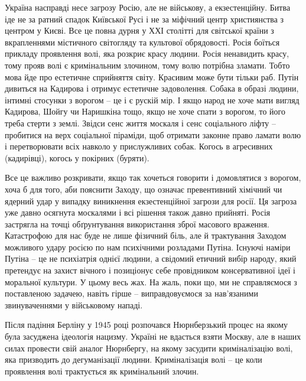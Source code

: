 Україна насправді несе загрозу Росію, але не військову, а екзестенційну. Битва
іде не за ратний спадок Київської Русі і не за міфічний центр християнства з
центром у Києві. Все це повна дурня у ХХІ столітті для світської країни з
вкрапленнями містичного світогляду та культової обрядовості. Росія боїться
прикладу проявлення волі, яка розкриє красу людини. Росія ненавидить красу,
тому прояв волі є кримінальним злочином, тому волю потрібна зламати. Тобто мова
йде про естетичне сприйняття світу. Красивим може бути тільки раб. Путін
дивиться на Кадирова і отримує естетичне задоволення. Собака в образі людини,
інтимні стосунки з ворогом – це і є рускій мір. І якщо народ не хоче мати
вигляд Кадирова, Шойгу чи Наришкіна тощо, якщо не хоче спати з ворогом, то його
треба стерти з землі. Звідси сенс життя москаля і сенс соціального ліфту –
пробитися на верх соціальної піраміди, щоб отримати законне право ламати волю і
перетворювати всіх навколо у прислужливих собак. Когось в агресивних
(кадирівці), когось у покірних (буряти).

Все це важливо розкривати, якщо так хочеться говорити і домовлятися з ворогом,
хоча б для того, аби пояснити Заходу, що означає превентивний хімічний чи
ядерний удар у випадку виникнення екзестенційної загрози для росії. Ця загроза
уже давно осягнута москалями і всі рішення також давно прийняті. Росія
застрягла на точці обґрунтування використання зброї масового враження.
Катастрофою для нас буде не лише фізичний біль, але й трактування Заходом
можливого удару росією по нам психічними розладами Путіна. Існуючі наміри
Путіна – це не психіатрія однієї людини, а свідомий етичний вибір народу, який
претендує на захист вічного і позиціонує себе провідником консервативної ідеї і
моральної культури. У цьому весь жах. На жаль, поки що, ми не справляємося з
поставленою задачею, навіть гірше – виправдовуємося за нав'язаними
звинуваченнями у військовому нападі. 

Після падіння Берліну у 1945 році розпочався Нюрнберзький процес на якому була
засуджена ідеологія нацизму. Україні не вдасться взяти Москву, але в наших
силах провести свій аналог Нюрнбергу, на якому засудити криміналізацію волі,
яка призводить до дегуманізації людини. Криміналізація волі – це коли
проявлення волі трактується як кримінальний злочин.


